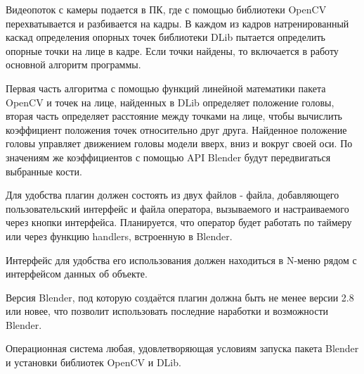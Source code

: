 
Видеопоток с камеры подается в ПК, где с помощью библиотеки OpenCV перехватывается и разбивается на кадры. В каждом из кадров натренированный каскад определения опорных точек библиотеки DLib пытается определить опорные точки на лице в кадре. Если точки найдены, то включается в работу основной алгоритм программы.

Первая часть алгоритма с помощью функций линейной математики пакета OpenCV и точек на лице, найденных в DLib определяет положение головы, вторая часть определяет расстояние между точками на лице, чтобы вычислить коэффициент положения точек относительно друг друга. Найденное положение головы управляет движением головы модели вверх, вниз и вокруг своей оси. По значениям же коэффициентов с помощью API Blender будут передвигаться выбранные кости.

Для удобства плагин должен состоять из двух файлов - файла, добавляющего пользовательский интерфейс и файла оператора, вызываемого и настраиваемого через кнопки интерфейса. Планируется, что оператор будет работать по таймеру или через функцию handlers, встроенную в Blender.

Интерфейс для удобства его использования должен находиться в N-меню рядом с интерфейсом данных об объекте.

Версия Blender, под которую создаётся плагин должна быть не менее версии 2.8 или новее, что позволит использовать последние наработки и возможности Blender.

Операционная система любая, удовлетворяющая условиям запуска пакета Blender и установки библиотек OpenCV и DLib.

\clearpage
